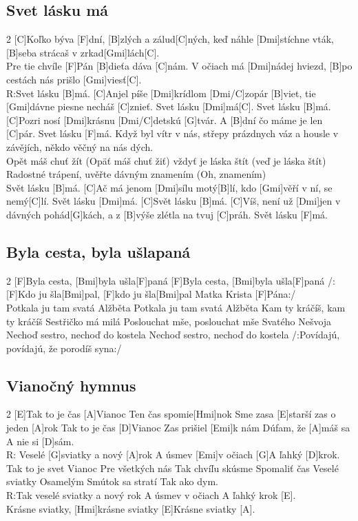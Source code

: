 \documentclass[12pt]{article}
\begin{document}
\subsection{Svet lásku má}
\begin{multicols}{2}
	[C]Koľko býva [F]dní,
	[B]zlých a zálud[C]ných,
	keď náhle [Dmi]stíchne vták,
	[B]seba strácaš v zrkad[Gmi]lách[C].
	\\
	[C]Pre tie chvíle [F]Pán
	[B]dieťa dáva [C]nám.
	V očiach má [Dmi]nádej hviezd,
	[B]po cestách nás prišlo [Gmi]viesť[C].
	\\
	R:Svet lásku [B]má.
	[C]Anjel píše [Dmi]krídlom [Dmi/C]zopár [B]viet,
	tie [Gmi]dávne piesne necháš [C]znieť.
	Svet lásku [Dmi]má[C].
	Svet lásku [B]má.
	[C]Pozri nosí [Dmi]krásnu [Dmi/C]detskú [G]tvár.
	A [B]dní čo máme je len [C]pár.
	Svet lásku [F]má.
	\columnbreak
	Když byl vítr v nás,
	střepy prázdnych váz
	a housle v závějích,
	někdo věčný na nás dých.
	\\
	Opět máš chuť žít (Opäť máš chuť žiť)
	vždyť je láska štít (veď je láska štít)
	Radostné trápení,
	uvěřte dávným znamením (Oh, znamením)
	\\
	Svět lásku [B]má.
	[C]Ač má jenom [Dmi]sílu motý[B]lí,
	kdo [Gmi]věří v ní, se nemý[C]lí.
	Svět lásku [Dmi]má.
	[C]Svět lásku [B]má.
	[C]Víš, není už [Dmi]jen v dávných pohád[G]kách,
	a z [B]výše zlétla na tvuj [C]práh.
	Svět lásku [F]má.
\end{multicols}

\subsection{Byla cesta, byla ušlapaná}
\begin{multicols}{2}
	[F]Byla cesta, [Bmi]byla ušla[F]paná
	[F]Byla cesta, [Bmi]byla ušla[F]paná
	/:[F]Kdo ju šla[Bmi]pal, [F]kdo ju šla[Bmi]pal
	Matka Krista [F]Pána:/
	\\
	Potkala ju tam svatá Alžběta
	Potkala ju tam svatá Alžběta
	Kam ty kráčíš, kam ty kráčíš
	Sestřičko má milá
	Poslouchat mše, poslouchat mše
	Svatého Nešvoja
	\columnbreak
	Nechoď sestro, nechoď do kostela
	Nechoď sestro, nechoď do kostela
	/:Povídajú, povídajú, že porodíš syna:/
\end{multicols}

\subsection{Vianočný hymnus}
\begin{multicols}{2}
	[E]Tak to je čas [A]Vianoc
	Ten čas spomie[Hmi]nok
	Sme zasa [E]starší zas o jeden [A]rok
	Tak to je čas [D]Vianoc
	Zas prišiel [Emi]k nám
	Dúfam, že [A]máš sa
	A nie si [D]sám.
	\\
	R: Veselé [G]sviatky a nový [A]rok
	A úsmev [Emi]v očiach
	[G]A ľahký [D]krok.
	\columnbreak
	Tak to je svet Vianoc
	Pre všetkých nás
	Tak chvíľu skúsme
	Spomaliť čas
	Veselé sviatky
	Osamelým
	Smútok sa stratí
	Tak ako dym.
	\\
	R:Tak veselé sviatky a nový rok
	A úsmev v očiach
	A ľahký krok [E].
	\\
	[A]Krásne sviatky, 
	[Hmi]krásne sviatky
	[E]Krásne sviatky [A].
\end{multicols}
\end{document}
